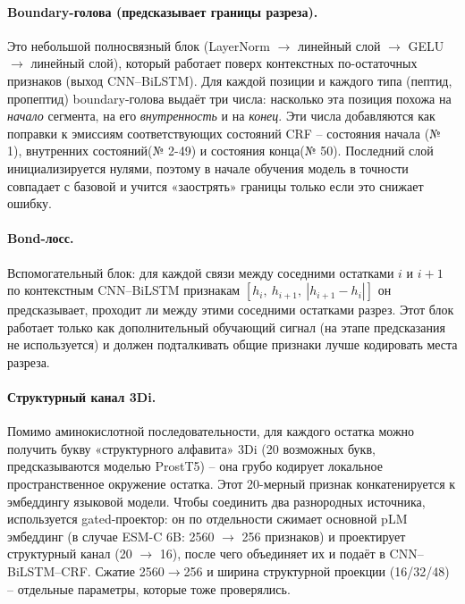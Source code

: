\documentclass{article}
\begin{document}
\paragraph{Boundary-голова (предсказывает границы разреза).} Это небольшой полносвязный блок (LayerNorm $\to$ линейный слой $\to$ GELU $\to$ линейный слой), который работает поверх контекстных по-остаточных признаков (выход CNN--BiLSTM). Для каждой позиции и каждого типа (пептид, пропептид) boundary-голова выдаёт три числа: насколько эта позиция похожа на \emph{начало} сегмента, на его \emph{внутренность} и на \emph{конец}. Эти числа добавляются как поправки к эмиссиям соответствующих состояний CRF -- состояния начала (№ 1), внутренних состояний(№ 2-49) и состояния конца(№ 50). Последний слой инициализируется нулями, поэтому в начале обучения модель в точности совпадает с базовой и учится «заострять» границы только если это снижает ошибку.

\paragraph{Bond-лосс.} Вспомогательный блок: для каждой связи между соседними остатками $i$ и $i{+}1$ по контекстным CNN--BiLSTM признакам $[h_i,\ h_{i+1},\ |h_{i+1}-h_i|]$ он предсказывает, проходит ли между этими соседними остатками разрез. Этот блок работает только как дополнительный обучающий сигнал (на этапе предсказания не используется) и должен подталкивать общие признаки лучше кодировать места разреза.

\paragraph{Структурный канал 3Di.} Помимо аминокислотной последовательности, для каждого остатка можно получить букву «структурного алфавита» 3Di (20 возможных букв, предсказываются моделью ProstT5) -- она грубо кодирует локальное пространственное окружение остатка. Этот 20-мерный признак конкатенируется к эмбеддингу языковой модели. Чтобы соединить два разнородных источника, используется gated-проектор: он по отдельности сжимает основной pLM эмбеддинг (в случае ESM-C 6B: 2560 $\to$ 256 признаков) и проектирует структурный канал (20 $\to$ 16), после чего объединяет их и подаёт в CNN--BiLSTM--CRF. Сжатие 2560$\to$256 и ширина структурной проекции (16/32/48) -- отдельные параметры, которые тоже проверялись.
\end{document}
